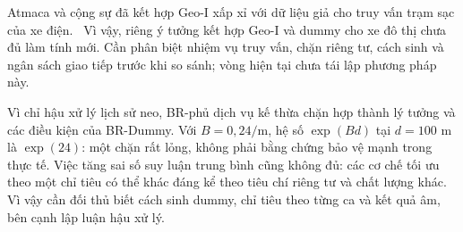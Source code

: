 Atmaca và cộng sự đã kết hợp Geo-I xấp xỉ với dữ liệu giả cho truy vấn trạm sạc của xe điện.~\citep{atmaca2024ev} Vì vậy, riêng ý tưởng kết hợp Geo-I và dummy cho xe đô thị chưa đủ làm tính mới. Cần phân biệt nhiệm vụ truy vấn, chặn riêng tư, cách sinh và ngân sách giao tiếp trước khi so sánh; vòng hiện tại chưa tái lập phương pháp này.

Vì chỉ hậu xử lý lịch sử neo, BR-phủ dịch vụ kế thừa chặn hợp thành lý tưởng và các điều kiện của BR-Dummy. Với $B=0{,}24/\mathrm m$, hệ số $\exp(Bd)$ tại $d=100$ m là $\exp(24)$: một chặn rất lỏng, không phải bằng chứng bảo vệ mạnh trong thực tế. Việc tăng sai số suy luận trung bình cũng không đủ: các cơ chế tối ưu theo một chỉ tiêu có thể khác đáng kể theo tiêu chí riêng tư và chất lượng khác.~\citep{oya2017drawing} Vì vậy cần đối thủ biết cách sinh dummy, chỉ tiêu theo từng ca và kết quả âm, bên cạnh lập luận hậu xử lý.
\par\endgroup
